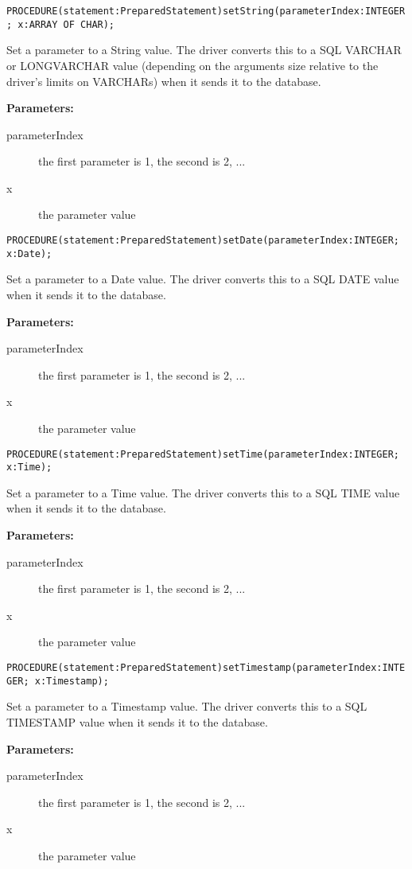 
\verb'PROCEDURE(statement:PreparedStatement)setString(parameterIndex:INTEGER; x:ARRAY OF CHAR);'

Set a parameter to a String value. The driver converts this to a SQL VARCHAR or LONGVARCHAR value (depending on the arguments size relative to the driver's limits on VARCHARs) when it sends it to the database. 

{\bf Parameters: }
\begin{description}
\item[parameterIndex] the first parameter is 1, the second is 2, ... 
\item[x] the parameter value 
\end{description}



\verb'PROCEDURE(statement:PreparedStatement)setDate(parameterIndex:INTEGER; x:Date);'

Set a parameter to a Date value. The driver converts this to a SQL DATE value when it sends it to the database. 

{\bf Parameters: }
\begin{description}
\item[parameterIndex] the first parameter is 1, the second is 2, ... 
\item[x] the parameter value 
\end{description}



\verb'PROCEDURE(statement:PreparedStatement)setTime(parameterIndex:INTEGER; x:Time);'

Set a parameter to a Time value. The driver converts this to a SQL TIME value when it sends it to the database. 

{\bf Parameters: }
\begin{description}
\item[parameterIndex] the first parameter is 1, the second is 2, ... 
\item[x] the parameter value 
\end{description}



\verb'PROCEDURE(statement:PreparedStatement)setTimestamp(parameterIndex:INTEGER; x:Timestamp);'

Set a parameter to a Timestamp value. The driver converts this to a SQL TIMESTAMP value when it sends it to the database. 

{\bf Parameters: }
\begin{description}
\item[parameterIndex] the first parameter is 1, the second is 2, ... 
\item[x] the parameter value 
\end{description}


